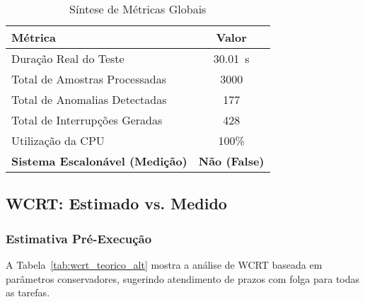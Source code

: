 \documentclass[conference]{IEEEtran}
\begin{document}
\begin{table}[H]
\caption{Síntese de Métricas Globais}
\begin{center}
\begin{tabular}{@{}lc@{}}
\toprule
\textbf{Métrica} & \textbf{Valor} \\
\midrule
Duração Real do Teste & \SI{30.01}{\second} \\
Total de Amostras Processadas & 3000 \\
Total de Anomalias Detectadas & 177 \\
Total de Interrupções Geradas & 428 \\
Utilização da CPU & 100\% \\
\textbf{Sistema Escalonável (Medição)} & \textbf{Não (False)} \\
\bottomrule
\end{tabular}
\label{tab:global_metrics_alt}
\end{center}
\end{table}

\subsection{WCRT: Estimado vs. Medido}
\subsubsection{Estimativa Pré-Execução}
A Tabela~\ref{tab:wcrt_teorico_alt} mostra a análise de WCRT baseada em parâmetros conservadores, sugerindo atendimento de prazos com folga para todas as tarefas.

\begin{table}[H]
\caption{Análise Teórica de WCRT (Estimativa)}
\begin{center}
\label{tab:wcrt_teorico_alt}
\end{center}
\end{table}
\end{document}
